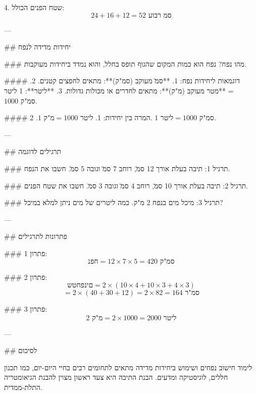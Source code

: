 4. שטח הפנים הכולל:
   \[
   24 + 16 + 12 = 52 \text{ ס\"מ רבוע}
   \]

---

## יחידות מדידה לנפח

### מהו נפח?
נפח הוא כמות המקום שהגוף תופס בחלל, והוא נמדד ביחידות מעוקבות.

#### דוגמאות ליחידות נפח:
1. **ס\"מ מעוקב ($\text{סמ"ק}$)**: מתאים לחפצים קטנים.
2. **מטר מעוקב ($\text{מ"ק}$)**: מתאים לחדרים או מכולות גדולות.
3. **ליטר**: 1 ליטר = $1000 \text{ סמ"ק}$.

#### המרה בין יחידות:
1. $1 \text{ מ"ק} = 1000 \text{ ליטר}$.
2. $1 \text{ ליטר} = 1000 \text{ סמ"ק}$.

---

## תרגילים לדוגמה

### תרגיל 1:
תיבה בעלת אורך 12 ס\"מ, רוחב 7 ס\"מ וגובה 5 ס\"מ. חשבו את הנפח.

### תרגיל 2:
תיבה בעלת אורך 10 ס\"מ, רוחב 4 ס\"מ וגובה 3 ס\"מ. חשבו את שטח הפנים.

### תרגיל 3:
מיכל מים בנפח 2 מ"ק. כמה ליטרים של מים ניתן למלא במיכל?

---

## פתרונות לתרגילים

### פתרון 1:
\[
נפח = 12 \times 7 \times 5 = 420 \text{ סמ"ק}
\]

### פתרון 2:
\[
שטח פנים = 2 \times (10 \times 4 + 10 \times 3 + 4 \times 3)
\]
\[
= 2 \times (40 + 30 + 12) = 2 \times 82 = 164 \text{ סמ"ר}
\]

### פתרון 3:
\[
2 \text{ מ"ק} = 2 \times 1000 = 2000 \text{ ליטר}
\]

---

## לסיכום

לימוד חישוב נפחים ושימוש ביחידות מדידה מתאים לתחומים רבים בחיי היום-יום, כמו תכנון חללים, לוגיסטיקה ומדעים. הבנת התיבה היא צעד ראשון מצוין להבנת הגיאומטריה התלת-ממדית.

